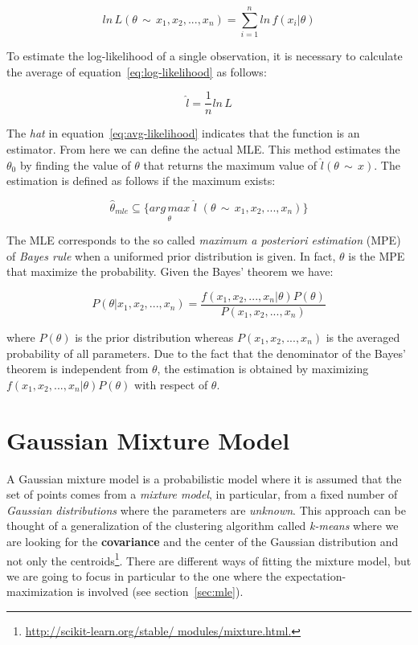 \begin{equation}
\label{eq:log-likelihood}
	ln \, L(\theta \, \sim \, x_{1}, x_{2}, ... , x_{n}) = \sum_{i=1}^{n} ln \, f(x_{i} | \theta)
\end{equation}

\noindent To estimate the log-likelihood of a single observation, it is necessary to calculate the average of equation~\ref{eq:log-likelihood} as follows:

\begin{equation}
\label{eq:avg-likelihood}
	\hat{l} = \frac{1}{n} ln \, L
\end{equation}

\noindent The \textit{hat} in equation~\ref{eq:avg-likelihood} indicates that the function is an estimator. From here we can define the actual MLE.
This method estimates the $\theta_{0}$ by finding the value of $\theta$ that returns the maximum value of $\hat{l}(\theta \, \sim \, x)$. The estimation is defined as follows if the maximum exists:

\begin{equation}
	\hat{\theta}_{mle} \subseteq \{ \underset{\theta}{arg \, max} \,\, \hat{l} \,\, (\theta \, \sim \, x_{1}, x_{2}, ... , x_{n})\}
\end{equation}

\noindent The MLE corresponds to the so called \textit{maximum a posteriori estimation} (MPE) of \textit{Bayes rule} when a uniformed prior distribution is given. In fact, $\theta$ is the MPE that maximize the probability. Given the Bayes' theorem we have:

\begin{equation}
	P (\theta | x_{1}, x_{2}, ... , x_{n}) = \frac{f(x_{1}, x_{2}, ... , x_{n} | \theta) P(\theta)}{P(x_{1}, x_{2}, ... , x_{n})}
\end{equation}

\noindent where $P(\theta)$ is the prior distribution whereas $P(x_{1}, x_{2}, ... , x_{n})$ is the averaged probability of all parameters. Due to the fact that the denominator of the Bayes' theorem is independent from $\theta$, the estimation is obtained by maximizing $f(x_{1}, x_{2}, ... , x_{n} | \theta) P(\theta)$ with respect of $\theta$.


\section{Gaussian Mixture Model}
A Gaussian mixture model is a probabilistic model where it is assumed that the set of points comes from a \textit{mixture model}, in particular, from a fixed number of \textit{Gaussian distributions} where the parameters are \textit{unknown}. This approach can be thought of a generalization of the clustering algorithm called \textit{k-means} where we are looking for the \textbf{covariance} and the center of the Gaussian distribution and not only the centroids\footnote{\url{http://scikit-learn.org/stable/ modules/mixture.html.}}. There are different ways of fitting the mixture model, but we are going to focus in particular to the one where the expectation-maximization is involved (see section~\ref{sec:mle}). \\

